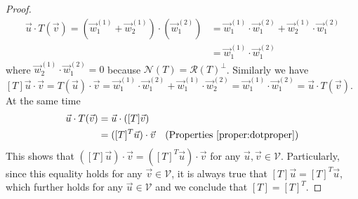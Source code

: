 \begin{proof}
\begin{align*}
\vec{u} \cdot T(\vec{v}) = (\vec{w}_1^{(1)} + \vec{w}_2^{(1)}) \cdot (\vec{w}_1^{(2)}) &= \vec{w}_1^{(1)} \cdot \vec{w}_1^{(2)} + \vec{w}_2^{(1)} \cdot \vec{w}_1^{(2)} \\
&= \vec{w}_1^{(1)} \cdot \vec{w}_1^{(2)}
\end{align*}
where $\vec{w}_2^{(1)} \cdot \vec{w}_1^{(2)} = 0$ because $\mathcal{N}(T) = \mathcal{R}(T)^\perp$. Similarly we have $[T]\vec{u} \cdot \vec{v} = T(\vec{u}) \cdot \vec{v} = \vec{w}_1^{(1)} \cdot \vec{w}_1^{(2)} + \vec{w}_1^{(1)} \cdot \vec{w}_2^{(2)} = \vec{w}_1^{(1)} \cdot \vec{w}_1^{(2)} = \vec{u} \cdot T(\vec{v})$. At the same time
\begin{align*}
\vec{u} \cdot T(\vec{v}) &= \vec{u} \cdot ([T]\vec{v}) \\
&= ([T]^T\vec{u}) \cdot \vec{v} & \text{(Properties \ref{proper:dotproper})}
\end{align*}
This shows that $([T]\vec{u}) \cdot \vec{v} = ([T]^T\vec{u}) \cdot \vec{v}$ for any $\vec{u}, \vec{v} \in \mathcal{V}$. Particularly, since this equality holds for any $\vec{v} \in \mathcal{V}$, it is always true that $[T]\vec{u} = [T]^T\vec{u}$, which further holds for any $\vec{u} \in \mathcal{V}$ and we conclude that $[T] = [T]^T$.
\end{proof}

